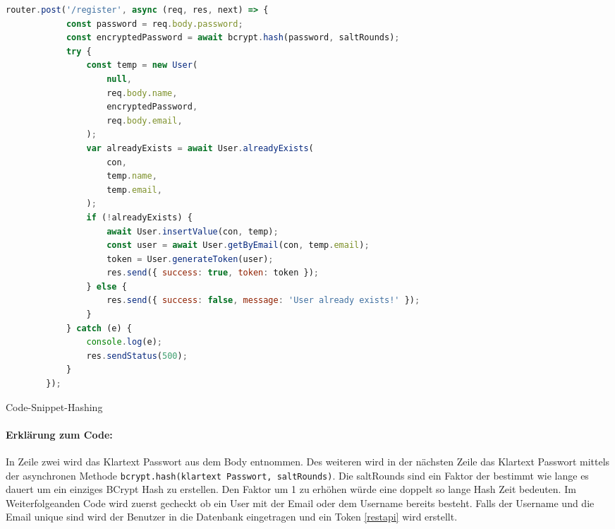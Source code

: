 \begin{code}[H]
    \begin{lstlisting}[firstnumber=1,language=JavaScript, style=CMD]
        router.post('/register', async (req, res, next) => {
            const password = req.body.password;
            const encryptedPassword = await bcrypt.hash(password, saltRounds);
            try {
                const temp = new User(
                    null,
                    req.body.name,
                    encryptedPassword,
                    req.body.email,
                );
                var alreadyExists = await User.alreadyExists(
                    con,
                    temp.name,
                    temp.email,
                );
                if (!alreadyExists) {
                    await User.insertValue(con, temp);
                    const user = await User.getByEmail(con, temp.email);
                    token = User.generateToken(user);
                    res.send({ success: true, token: token });
                } else {
                    res.send({ success: false, message: 'User already exists!' });
                }
            } catch (e) {
                console.log(e);
                res.sendStatus(500);
            }
        });
    \end{lstlisting}
    \caption{Code-Snippet-Hashing}
\end{code}

\paragraph{Erklärung zum Code:}
In Zeile zwei wird das Klartext Passwort aus dem Body entnommen. Des weiteren
wird in der nächsten Zeile das Klartext Passwort mittels der asynchronen Methode
\texttt{bcrypt.hash(klartext Passwort, saltRounds)}. Die saltRounds sind ein
Faktor der bestimmt wie lange es dauert um ein einziges BCrypt Hash zu erstellen.
Den Faktor um 1 zu erhöhen würde eine doppelt so lange Hash Zeit bedeuten.
Im Weiterfolgeanden Code wird zuerst gecheckt ob ein User mit der Email oder dem Username bereits
besteht. Falls der Username und die Email unique sind wird der Benutzer
in die Datenbank eingetragen und ein Token \ref*{restapi} wird erstellt.
\cite{MySQL}
\label{db}

